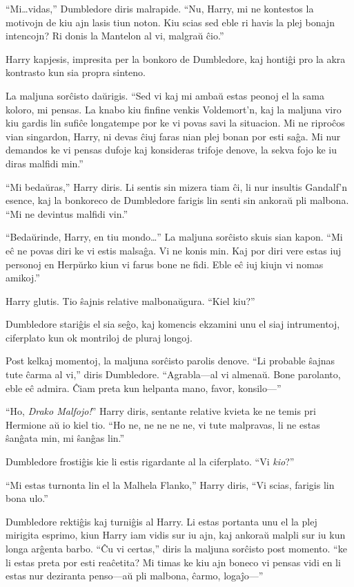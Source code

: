 ``Mi\ldots vidas,'' Dumbledore diris malrapide. ``Nu, Harry, mi ne
kontestos la motivojn de kiu ajn lasis tiun noton. Kiu scias sed eble
ri havis la plej bonajn intencojn? Ri donis la Mantelon al vi, malgraŭ
ĉio.''

Harry kapjesis, impresita per la bonkoro de Dumbledore, kaj hontiĝi
pro la akra kontrasto kun sia propra sinteno.

La maljuna sorĉisto daŭrigis. ``Sed vi kaj mi ambaŭ estas peonoj el la
sama koloro, mi pensas. La knabo kiu finfine venkis Voldemort'n, kaj
la maljuna viro kiu gardis lin sufiĉe longatempe por ke vi povas savi
la situacion. Mi ne riproĉos vian singardon, Harry, ni devas ĉiuj
faras nian plej bonan por esti saĝa. Mi nur demandos ke vi pensas
dufoje kaj konsideras trifoje denove, la sekva fojo ke iu diras
malfidi min.''

``Mi bedaŭras,'' Harry diris. Li sentis sin mizera tiam ĉi, li nur
insultis Gandalf'n esence, kaj la bonkoreco de Dumbledore farigis lin
senti sin ankoraŭ pli malbona. ``Mi ne devintus malfidi vin.''

``Bedaŭrinde, Harry, en tiu mondo\ldots'' La maljuna sorĉisto skuis
sian kapon. ``Mi eĉ ne povas diri ke vi estis malsaĝa. Vi ne konis
min. Kaj por diri vere estas iuj personoj en Herpŭrko kiun vi farus
bone ne fidi. Eble eĉ iuj kiujn vi nomas amikoj.''

Harry glutis. Tio ŝajnis relative malbonaŭgura. ``Kiel kiu?''

Dumbledore stariĝis el sia seĝo, kaj komencis ekzamini unu el siaj
intrumentoj, ciferplato kun ok montriloj de pluraj longoj.

Post kelkaj momentoj, la maljuna sorĉisto parolis denove. ``Li
probable ŝajnas tute ĉarma al vi,'' diris Dumbledore. ``Agrabla—al vi
almenaŭ. Bone parolanto, eble eĉ admira. Ĉiam preta kun helpanta mano,
favor, konsilo—''


``Ho, \emph{Drako Malfojo!}'' Harry diris, sentante relative kvieta ke
ne temis pri Hermione aŭ io kiel tio. ``Ho ne, ne ne ne ne, vi tute
malpravas, li ne estas ŝanĝata min, mi ŝanĝas lin.''

Dumbledore frostiĝis kie li estis rigardante al la ciferplato. ``Vi
\emph{kio}?''

``Mi estas turnonta lin el la Malhela Flanko,'' Harry diris, ``Vi
scias, farigis lin bona ulo.''

Dumbledore rektiĝis kaj turniĝis al Harry. Li estas portanta unu el la
plej mirigita esprimo, kiun Harry iam vidis sur iu ajn, kaj ankoraŭ
malpli sur iu kun longa arĝenta barbo. ``Ĉu vi certas,'' diris la
maljuna sorĉisto post momento. ``ke li estas preta por esti reaĉetita?
Mi timas ke kiu ajn boneco vi pensas vidi en li estas nur deziranta
penso—aŭ pli malbona, ĉarmo, logaĵo—''


